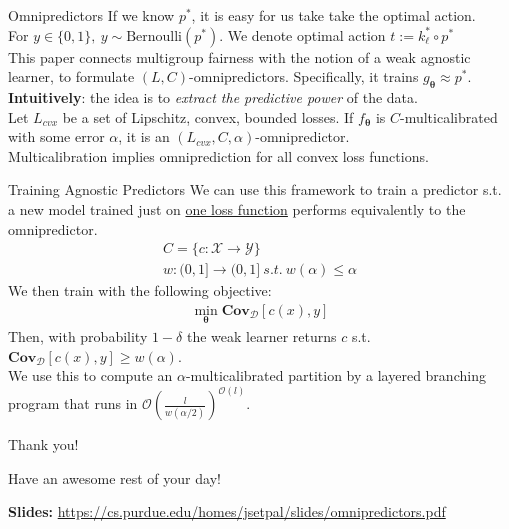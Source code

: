 \documentclass{beamer}
\begin{document}
\begin{frame}{Omnipredictors}
	If we know $p^*$, it is easy for us take take the optimal action. \pause \newline \\

	For $y \in \{0, 1\},~y \sim \text{Bernoulli}(p^*)$. We denote optimal action $t := k_\ell^* \circ p^*$\pause \newline \\

	This paper connects multigroup fairness with the notion of a weak agnostic learner, to formulate $(L, C)$-omnipredictors. \pause Specifically, it trains $g_{\bm{\theta}} \approx p^*$. \pause \newline \\

	\textbf{Intuitively}: the idea is to \textit{extract the predictive power} of the data. \pause \newline \\

	Let $L_{cvx}$ be a set of Lipschitz, convex, bounded losses. \pause If $f_{\bm{\theta}}$ is $C$-multicalibrated with some error $\alpha$, it is an $(L_{cvx}, C, \alpha)$-omnipredictor. \pause \newline \\

	Multicalibration implies omniprediction for all convex loss functions.
\end{frame}

\begin{frame}{Training Agnostic Predictors}
	We can use this framework to train a predictor s.t. a new model trained just on \underline{one loss function} performs equivalently to the omnipredictor.
	\begin{gather}
		C = \{c: \mathcal{X} \rightarrow \mathcal{Y}\} \\
		w: (0,1] \rightarrow (0, 1]~s.t.~w(\alpha) \leq \alpha
	\end{gather} \pause
	We then train with the following objective:
	\begin{gather}
		\min_{\bm{\theta}} \textbf{Cov}_{\mathcal{D}}[c(x), y]
	\end{gather}
	Then, with probability $1-\delta$ the weak learner returns $c$ s.t. $\textbf{Cov}_{\mathcal{D}}[c(x), y] \geq w(\alpha)$. \pause \newline \\

	We use this to compute an $\alpha$-multicalibrated partition by a layered branching program that runs in $\mathcal{O}(\frac{l}{w(\alpha/2)})^{\mathcal{O}(l)}$.
\end{frame}

\begin{frame}{Thank you!}
	\begin{center}
		Have an awesome rest of your day!
	\end{center}
	\begin{center}
		\textbf{Slides:} {\small \url{https://cs.purdue.edu/homes/jsetpal/slides/omnipredictors.pdf}}
	\end{center}
\end{frame}
\end{document}
